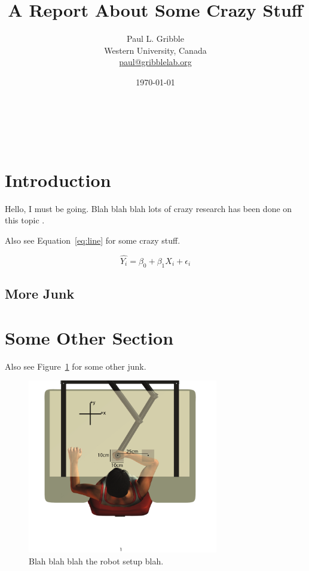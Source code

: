 \documentclass[letterpaper,titlepage,11pt]{article}
\title{A Report About Some Crazy Stuff}
\author{Paul L. Gribble\\Western University, Canada\\{\small \url{paul@gribblelab.org}}}
\date{\today}
\makeatletter
\renewcommand{\maketitle}{
\begin{flushleft}          %
{\LARGE\@title}            %
\vspace{20pt}\\            %
{\large\@author}           %
\\\@date                   %
\vspace{20pt}              %
\end{flushleft}
}
\makeatother
\begin{document}
\maketitle
\thispagestyle{empty}

\section{Introduction}

Hello, I must be going. Blah blah blah lots of crazy research has been done on this topic \citep{Mattar:2005}. \lipsum[1]

\lipsum[1]

Also see Equation~\ref{eq:line} for some crazy stuff.

\begin{equation}
\hat{Y_{i}} = \beta_{0} + \beta_{1} X_{i} + \epsilon_{i}
\label{eq:line}
\end{equation}

\lipsum[1]

\subsection{More Junk}

\lipsum[1-3]

\section{Some Other Section}

Also see Figure~\ref{fig:setupfig} for some other junk.

\begin{figure}[H]
	\centering
    \includegraphics[height=3in]{figure1.pdf}
 \caption{Blah blah blah the robot setup blah.}
 \label{fig:setupfig}
\end{figure}
\end{document}
